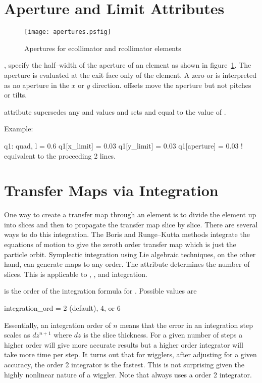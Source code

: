 \section{Aperture and Limit Attributes}
\label{s:limit}

\begin{figure}
  \centering
  \texttt{[image: apertures.psfig]}
  \caption{Apertures for ecollimator and rcollimator elements}
  \label{f:limit}
\end{figure}

,  specify the half--width of the 
aperture of an element as shown in figure~\ref{f:limit}. 
The aperture is evaluated at the exit
face only of the element. A zero  or 
is interpreted as no aperture in the $x$ or $y$ direction.
offsets move the aperture but not pitches or tilts.

 attribute supersedes
any  and  values and sets  and
 equal to the value of .

\noindent
Example:
\begin{example}
  q1: quad, l = 0.6
  q1[x_limit] = 0.03
  q1[y_limit] = 0.03
  q1[aperture] = 0.03  ! equivalent to the proceeding 2 lines.  
\end{example}

\section{Transfer Maps via Integration}
\label{s:integ}

One way to create a transfer map through an element is to divide the
element up into slices and then to propagate the transfer
map slice by slice.
There are several ways to do this integration. The Boris and Runge--Kutta 
methods integrate the equations of motion to give the zeroth order
transfer map which is just the particle orbit.
Symplectic integration using Lie algebraic techniques, on the other hand, 
can generate maps to any order.
The  attribute determines the number of slices. This is
applicable to , , and 
integration. 

 is the order of the integration formula for 
. Possible values are
\begin{example}
  integration\_ord = 2 (default), 4, or 6
\end{example}
Essentially, an integration order of $n$ means that the error in an 
integration step scales as $dz^{n+1}$ where $dz$ is the slice thickness.
For a given number of steps a higher order will give more accurate results
but a higher order integrator will take more time per step. It turns out
that for wigglers, after adjusting  for a given accuracy, 
the order 2 integrator is the fastest. This is not surprising given the
highly nonlinear nature of a wiggler. Note that  always
uses a order 2 integrator.

